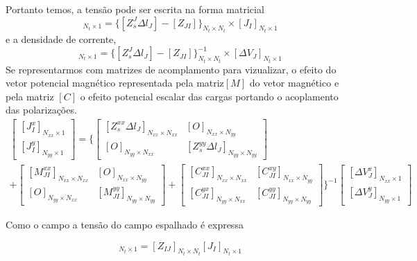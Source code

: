 \documentclass[
	12pt,				%
	openright,			%
	oneside,			%
	a4paper,			%
	english,			%
	brazil				%
	]{abntex2}
\begin{document}
Portanto temos, a tensão pode ser escrita na forma matricial
\begin{equation}
  [\Delta V_J]_{N_t \times 1} =\{ [Z_{s}^J\Delta l_J]-[Z_{JI}]\}_{N_t \times N_t}\times[J_I]_{N_t \times 1}
\end{equation} 
e a densidade de corrente,
\begin{equation}
  [J_I]_{N_t \times 1}=\{ [Z_{s}^J\Delta l_J]-[Z_{JI}]\}^{-1}_{N_t \times N_t} \times[\Delta V_J]_{N_t \times 1} 
\end{equation} 
Se representarmos com matrizes de acomplamento  para vizualizar, o  efeito do vetor potencial magnético representada pela matriz$[M]$ do vetor magnético e pela matriz $[C]$ o efeito potencial escalar das cargas  portando o acoplamento das polarizações.
\begin{equation}
\begin{aligned}
  \begin{bmatrix} [J^{x}_I]_{N_{xx}\times 1} \\ [J^{y}_I]_{N_{yy}\times 1}\end{bmatrix}  =\Biggl\{\begin{bmatrix}[Z_s^{xx}\Delta l_J]_{N_{xx}\times N_{xx}}& [O]_{N_{xx}\times N_{yy}}\\
   [O]_{N_{yy}\times N_{xx}}&[Z_s^{yy}\Delta l_J]_{N_{yy}\times N_{yy}}
   \end{bmatrix} 
   \\+
   \begin{bmatrix}[M_{JI}^{xx}]_{N_{xx}\times N_{xx}}& [O]_{N_{xx}\times N_{yy}}\\
   [O]_{N_{yy}\times N_{xx}}&[M_{JI}^{yy}]_{N_{yy}\times N_{yy}}
   \end{bmatrix}+
   \begin{bmatrix}[C_{JI}^{xx}]_{N_{xx}\times N_{xx}}& [C_{JI}^{xy}]_{N_{xx}\times N_{yy}}\\
   [C_{JI}^{yx}]_{N_{yy}\times N_{xx}}&[C_{JI}^{yy}]_{N_{yy}\times N_{yy}}
   \end{bmatrix} \Biggl\}^{-1}
\begin{bmatrix}[\Delta V^{x}_J]_{N_{xx}\times 1} \\ [\Delta V^{y}_J]_{N_{yy}\times 1}\end{bmatrix}
   \end{aligned}
\end{equation}

Como o campo a tensão do campo espalhado é expressa

\begin{equation}
  [\Delta V^s_J]_{N_t \times 1}= [Z_{IJ}]_{N_t \times N_t} [J_I]_{N_t \times 1} 
\end{equation}
\end{document}
